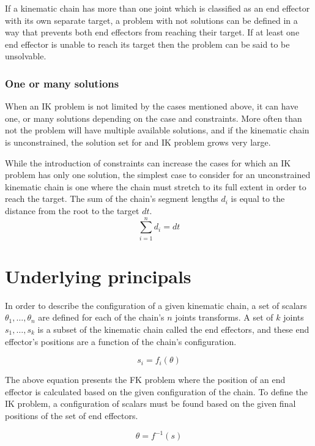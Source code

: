 If a kinematic chain has more than one joint which is classified as an end
effector with its own separate target, a problem with not solutions can be
defined in a way that prevents both end effectors from reaching their target.
If at least one end effector is unable to reach its target then the problem can
be said to be unsolvable.

\subsubsection{One or many solutions}
When an IK problem is not limited by the cases mentioned above, it can have one,
or many solutions depending on the case and constraints. More often than not the
problem will have multiple available solutions, and if the kinematic chain is
unconstrained, the solution set for and IK problem grows very large.

While the introduction of constraints can increase the cases for which an IK
problem has only one solution, the simplest case to consider for an
unconstrained kinematic chain is one where the chain must stretch to its full
extent in order to reach the target. The sum of the chain's segment lengths
\(d_i\) is equal to the distance from the root to the target \(dt\).
\begin{equation}
    \sum_{i=1}^{n}d_i = dt
\end{equation}

\section{Underlying principals}
In order to describe the configuration of a given kinematic chain, a set of
scalars \(\theta_1, \dots, \theta_n\) are defined for each of the chain's \(n\)
joints transforms. A set of \(k\) joints \(s_1, \dots, s_k\) is a subset of
the kinematic chain called the end effectors, and these end effector's positions
are a function of the chain's configuration.

\begin{equation}
    s_i = f_i(\theta)
\end{equation}

The above equation presents the FK problem where the position of an end effector is
calculated based on the given configuration of the chain. To define the IK
problem, a configuration of scalars must be found based on the given final
positions of the set of end effectors.

\begin{equation}
    \theta = f^{-1}(s)
\end{equation}


